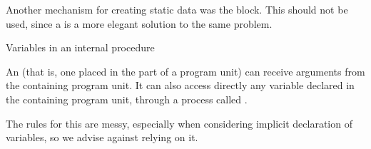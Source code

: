 Another mechanism for creating static data was the
 block. This should not be used, since a
 is a more elegant solution to the same problem.

 {Variables in an internal procedure}

An  (that is, one placed in the
 part of a program unit) can receive arguments
from the containing program unit. It can also access directly any
variable declared in the containing program unit, through a process
called .

The rules for this are messy, especially when considering implicit
declaration of variables, so we advise against relying on it.
